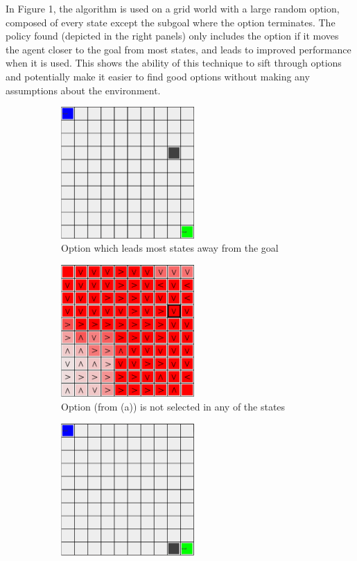 \documentclass{acm_proc_article-sp}
\begin{document}
In Figure 1, the algorithm is used on a grid world with a large random option, composed of every state except the subgoal where the option terminates. The policy found (depicted in the right panels) only includes the option if it moves the agent closer to the goal from most states, and leads to improved performance when it is used. This shows the ability of this technique to sift through options and potentially make it easier to find good options without making any assumptions about the environment.

\begin{figure}[!htbp]
  \begin{subfigure}[h]{.5\textwidth}
  	\centering
    \includegraphics[width=2in]{GiantOp1.png}
    \caption{Option which leads most states away from the goal}
  \end{subfigure}\hfill
  \begin{subfigure}[h]{.5\textwidth}
  \centering
    \includegraphics[width=2in]{GiantOption1Pol.png}
    \caption{Option (from (a)) is not selected in any of the states}
  \end{subfigure}
  \hfill
  \begin{subfigure}[h]{.5\textwidth}
  \centering
    \includegraphics[width=2in]{GiantOp2.png}

\end{subfigure}
\end{figure}
\end{document}
